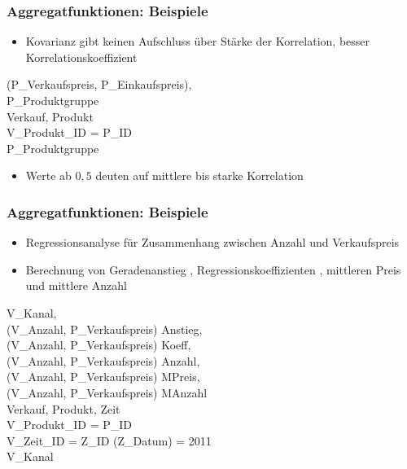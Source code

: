     \begin{frame}
    \frametitle{Aggregatfunktionen: Beispiele}
    
    \begin{itemize}
    \item Kovarianz gibt keinen Aufschluss über Stärke der Korrelation,
      besser Korrelationskoeffizient
    \end{itemize}
    
    \begin{sql}
     (P\_Verkaufspreis, P\_Einkaufspreis), \\
    \> P\_Produktgruppe \\
     Verkauf, Produkt \\
     V\_Produkt\_ID = P\_ID \\
     P\_Produktgruppe
    \end{sql}
    
    \begin{itemize}
    \item Werte ab $0{,}5$ deuten auf mittlere bis starke Korrelation
    \end{itemize}
    
    \end{frame}
    
    
    \begin{frame}[shrink]
    \frametitle{Aggregatfunktionen: Beispiele}
    
    \begin{itemize}
    \item Regressionsanalyse für Zusammenhang zwischen Anzahl und
      Verkaufspreis
    \item Berechnung von Geradenanstieg ,
      Regressionskoeffizienten , mittleren Preis
       und mittlere Anzahl 
    \end{itemize}
    
    {\begin{sql}
     V\_Kanal, \\
    \1(V\_Anzahl, P\_Verkaufspreis) 
    Anstieg, \\
     \1(V\_Anzahl, P\_Verkaufspreis)  Koeff, \\
      \1(V\_Anzahl, P\_Verkaufspreis)  Anzahl, \\
      \1(V\_Anzahl, P\_Verkaufspreis)  MPreis, \\
      \1(V\_Anzahl, P\_Verkaufspreis)  MAnzahl \\
     Verkauf, Produkt, Zeit \\
     V\_Produkt\_ID = P\_ID  \\
    V\_Zeit\_ID = Z\_ID  (Z\_Datum) = 2011 \\
     V\_Kanal
    \end{sql}}
    
    \end{frame}
    
